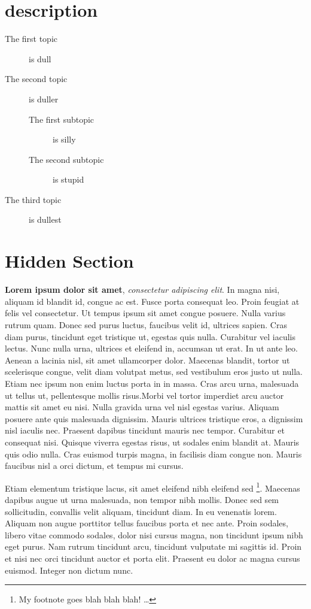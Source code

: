 \section*{description}
\begin{description}
\item[The first topic] is dull
\item[The second topic] is duller
\begin{description}
\item[The first subtopic] is silly
\item[The second subtopic] is stupid
\end{description}
\item[The third topic] is dullest
\end{description}


\clearpage

\tochide\section{Hidden Section}
\textbf{Lorem ipsum dolor sit amet}, \textit{consectetur adipiscing elit}. In magna nisi, aliquam id blandit id, congue ac est. Fusce porta consequat leo. Proin feugiat at felis vel consectetur. Ut tempus ipsum sit amet congue posuere. Nulla varius rutrum quam. Donec sed purus luctus, faucibus velit id, ultrices sapien. Cras diam purus, tincidunt eget tristique ut, egestas quis nulla. Curabitur vel iaculis lectus. Nunc nulla urna, ultrices et eleifend in, accumsan ut erat. In ut ante leo. Aenean a lacinia nisl, sit amet ullamcorper dolor. Maecenas blandit, tortor ut scelerisque congue, velit diam volutpat metus, sed vestibulum eros justo ut nulla. Etiam nec ipsum non enim luctus porta in in massa. Cras arcu urna, malesuada ut tellus ut, pellentesque mollis risus.Morbi vel tortor imperdiet arcu auctor mattis sit amet eu nisi. Nulla gravida urna vel nisl egestas varius. Aliquam posuere ante quis malesuada dignissim. Mauris ultrices tristique eros, a dignissim nisl iaculis nec. Praesent dapibus tincidunt mauris nec tempor. Curabitur et consequat nisi. Quisque viverra egestas risus, ut sodales enim blandit at. Mauris quis odio nulla. Cras euismod turpis magna, in facilisis diam congue non. Mauris faucibus nisl a orci dictum, et tempus mi cursus.

Etiam elementum tristique lacus, sit amet eleifend nibh eleifend sed \footnote{My footnote goes blah blah blah! \dots}. Maecenas dapibus augue ut urna malesuada, non tempor nibh mollis. Donec sed sem sollicitudin, convallis velit aliquam, tincidunt diam. In eu venenatis lorem. Aliquam non augue porttitor tellus faucibus porta et nec ante. Proin sodales, libero vitae commodo sodales, dolor nisi cursus magna, non tincidunt ipsum nibh eget purus. Nam rutrum tincidunt arcu, tincidunt vulputate mi sagittis id. Proin et nisi nec orci tincidunt auctor et porta elit. Praesent eu dolor ac magna cursus euismod. Integer non dictum nunc.


